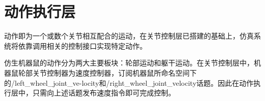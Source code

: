
\section{动作执行层}
动作即为一个或数个关节相互配合的运动，在关节控制层已搭建的基础上，仿真系统将依靠调用相关的控制接口实现特定动作。

仿生机器鼠的动作分为两大主要板块：轮部运动和躯干运动。在关节控制层中，机器鼠轮部关节控制器为速度控制器，订阅机器鼠所命名空间下的\//left\_wheel\_joint\_ve-\linebreak[1]locity和\//right\_wheel\_joint\_velocity话题。因此在动作执行层中，只需向上述话题发布速度指令即可完成控制。



